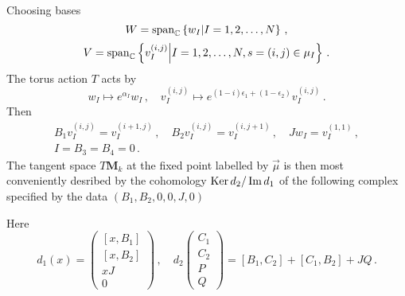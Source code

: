 \documentclass[main.tex]{subfiles}
\begin{document}
Choosing bases
\begin{equation}
 W=\operatorname{span}_{\mathbb{C}}\left\{w_I\middle|I=1,2,\dots,N\right\}\,,
 \end{equation}
\begin{equation} V=\operatorname{span}_{\mathbb{C}}\left\{v^{(i,j)}_{I}\middle|I=1,2,\dots,N,s=(i,j)\in\mu_I\right\}\,.
\end{equation} 
The torus action $T$ acts by
\begin{equation}
w_I\mapsto e^{\alpha_I}w_I\,,\quad v^{(i,j)}_{I}\mapsto e^{(1-i)\epsilon_1+(1-\epsilon_2)}v^{(i,j)}_{I}\,.
\end{equation}
Then
\begin{gather}\label{eqn:fixedpoint}
B_1v^{(i,j)}_{I}=v^{(i+1,j)}_{I}\,,\quad B_2v^{(i,j)}_{I}=v^{(i,j+1)}_{I}\,,\quad Jw_I=v^{(1,1)}_{I}\,,\\ I=B_3=B_4=0\,.
\end{gather}
The tangent space $T\mathbf{M}_{k}$ at the fixed point labelled by $\vec{\mu}$ is then most conveniently desribed by the cohomology $\operatorname{Ker} d_2/\operatorname{Im} d_1$ of the following complex specified by the data $(B_1,B_2,0,0,J,0)$ \cite{Kanno:2011fw,Losev:2003py,nakajima1999lectures,Bruzzo:2002xf}
\begin{center}
\end{center}
Here 
\begin{equation}
d_1(x)=\begin{pmatrix}
[x,B_1]\\
[x,B_2]\\
xJ\\
0
\end{pmatrix}\,,\quad d_2\begin{pmatrix}
C_1\\
C_2\\
P\\
Q
\end{pmatrix}=[B_1,C_2]+[C_1,B_2]+JQ\,.
\end{equation}
\end{document}
